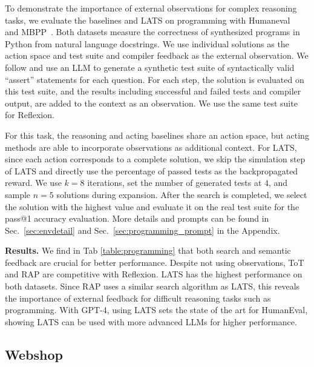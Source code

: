 \documentclass{article} \usepackage{iclr2024_conference,times}
\begin{document}
To demonstrate the importance of external observations for complex reasoning tasks, we evaluate the baselines and LATS on programming with Humaneval~\citep{chen2021evaluating} and MBPP~\citep{austin2021program}. Both datasets measure the correctness of synthesized programs in Python from natural language docstrings. We use individual solutions as the action space and test suite and compiler feedback as the external observation. We follow \citet{bei2022codet} and use an LLM to generate a synthetic test suite of syntactically valid ``assert'' statements for each question. For each step, the solution is evaluated on this test suite, and the results including successful and failed tests and compiler output, are added to the context as an observation. We use the same test suite for Reflexion. 

For this task, the reasoning and acting baselines share an action space, but acting methods are able to incorporate observations as additional context. For LATS, since each action corresponds to a complete solution, we skip the simulation step of LATS and directly use the percentage of passed tests as the backpropagated reward. We use $k = 8$ iterations, set the number of generated tests at $4$, and sample $n = 5$ solutions during expansion. After the search is completed, we select the solution with the highest value and evaluate it on the real test suite for the pass@1 accuracy evaluation. More details and prompts can be found in Sec.~\ref{sec:envdetail} and Sec.~\ref{sec:programming_prompt} in the Appendix.

\textbf{Results.} We find in Tab \ref{table:programming} that both search and semantic feedback are crucial for better performance. Despite not using observations, ToT and RAP are competitive with Reflexion. LATS has the highest performance on both datasets. Since RAP uses a similar search algorithm as LATS, this reveals the importance of external feedback for difficult reasoning tasks such as programming. With GPT-4, using LATS sets the state of the art for HumanEval, showing LATS can be used with more advanced LLMs for higher performance.

\subsection{Webshop}
\end{document}
